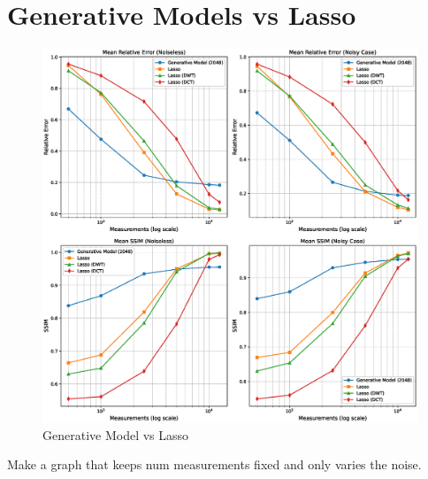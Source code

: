 \section{Generative Models vs Lasso}
\begin{figure}[h!]
    \centering
    \includegraphics[width=\textwidth]{figures/06_results/gen_vs_lasso.eps}
    \caption{Generative Model vs Lasso}
\end{figure}
Make a graph that keeps num measurements fixed and only varies the noise.

